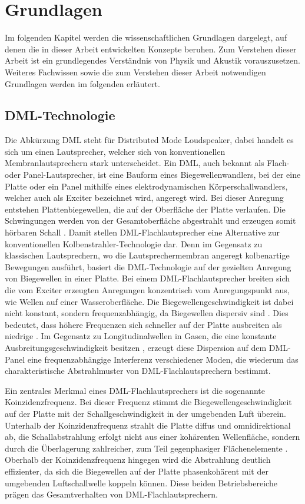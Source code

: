 \chapter{Grundlagen}

Im folgenden Kapitel werden die wissenschaftlichen Grundlagen dargelegt, auf denen die in dieser Arbeit entwickelten Konzepte beruhen. Zum Verstehen dieser Arbeit ist ein grundlegendes Verständnis von Physik und Akustik vorauszusetzen. Weiteres Fachwissen sowie die zum Verstehen dieser Arbeit notwendigen Grundlagen werden im folgenden erläutert. 


\section{DML-Technologie}

Die Abkürzung DML steht für Distributed Mode Loudspeaker, dabei handelt es sich um einen Lautsprecher, welcher sich von konventionellen Membranlautsprechern stark unterscheidet. Ein DML, auch bekannt als Flach- oder Panel-Lautsprecher, ist eine Bauform eines Biegewellenwandlers, bei der eine Platte oder ein Panel mithilfe eines elektrodynamischen Körperschallwandlers, welcher auch als Exciter bezeichnet wird, angeregt wird. Bei dieser Anregung entstehen Plattenbiegewellen, die auf der Oberfläche der Platte verlaufen. Die Schwingungen werden von der Gesamtoberfläche abgestrahlt und erzeugen somit hörbaren Schall \cite{Moeser2005, Li2010, TectonicAudioLabs2013}. Damit stellen DML-Flachlautsprecher eine Alternative zur konventionellen Kolbenstrahler-Technologie dar. Denn im Gegensatz zu klassischen Lautsprechern, wo die Lautsprechermembran angeregt kolbenartige Bewegungen ausführt, basiert die DML-Technologie auf der gezielten Anregung von Biegewellen in einer Platte. 
Bei einem DML-Flachlautsprecher breiten sich die vom Exciter erzeugten Anregungen konzentrisch vom Anregungspunkt aus, wie Wellen auf einer Wasseroberfläche. Die Biegewellengeschwindigkeit ist dabei nicht konstant, sondern frequenzabhängig, da Biegewellen dispersiv sind \cite{Moeser2005}. Dies bedeutet, dass höhere Frequenzen sich schneller auf der Platte ausbreiten als niedrige \cite{Redondo2007}. Im Gegensatz zu Longitudinalwellen in Gasen, die eine konstante Ausbreitungsgeschwindigkeit besitzen \cite{DEGA2006}, erzeugt diese Dispersion auf dem DML-Panel eine frequenzabhängige Interferenz verschiedener Moden, die wiederum das charakteristische Abstrahlmuster von DML-Flachlautsprechern bestimmt.


Ein zentrales Merkmal eines DML-Flachlautsprechers ist die sogenannte Koinzidenzfrequenz. Bei dieser Frequenz stimmt die Biegewellengeschwindigkeit auf der Platte mit der Schallgeschwindigkeit in der umgebenden Luft überein. Unterhalb der Koinzidenzfrequenz strahlt die Platte diffus und omnidirektional ab, die Schallabstrahlung erfolgt nicht aus einer kohärenten Wellenfläche, sondern durch die Überlagerung zahlreicher, zum Teil gegenphasiger Flächenelemente \cite{Cremer1996}. Oberhalb der Koinzidenzfrequenz hingegen wird die Abstrahlung deutlich effizienter, da sich die Biegewellen auf der Platte phasenkohärent mit der umgebenden Luftschallwelle koppeln können. Diese beiden Betriebsbereiche prägen das Gesamtverhalten von DML-Flachlautsprechern.

